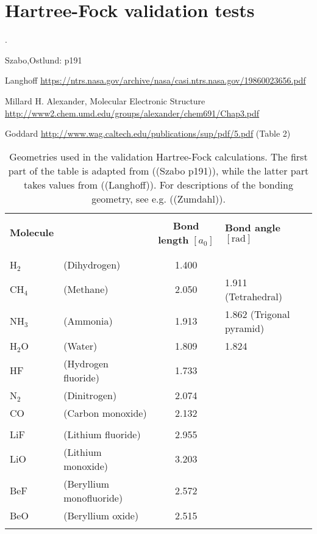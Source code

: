 \documentclass[a4paper]{article}
\title{}
\date{}
\author{}
\newcommand{\R}{\mathbb{R}}
\begin{document}
\renewcommand{\R}{{\bf R}}
\renewcommand{\r}{{\bf r}}
\newcommand{\p}{{\bf p}}
\newcommand{\q}{{\bf q}}
\renewcommand{\H}{\mathcal{H}}
\newcommand{\psit}{\left|\psi(t)\right\rangle}


\section{Hartree-Fock validation tests}
.

Szabo,Ostlund: p191

Langhoff \url{https://ntrs.nasa.gov/archive/nasa/casi.ntrs.nasa.gov/19860023656.pdf}

Millard H. Alexander, Molecular Electronic Structure \url{http://www2.chem.umd.edu/groups/alexander/chem691/Chap3.pdf}

Goddard \url{http://www.wag.caltech.edu/publications/sup/pdf/5.pdf} (Table 2)

\begin{table}
\setlength\extrarowheight{2pt}
\begin{tabularx}{\textwidth}{l X c l}
\hline
\hline
\\[-0.9em]
\textbf{Molecule} & & \textbf{Bond length} $[a_0]$ & \textbf{Bond angle} $[\text{rad}]$ \\
\\[-0.9em]
\hline
\\[-0.9em]
H${}_2$ & (Dihydrogen)   & 1.400 & \\
CH${}_4$ &(Methane)      & 2.050 & 1.911 (Tetrahedral)       \\
NH${}_3$ &(Ammonia)      & 1.913 & 1.862 (Trigonal pyramid)  \\
H${}_2$O &(Water)        & 1.809 & 1.824                     \\
HF &(Hydrogen fluoride)  & 1.733 & \\
N${}_2$ &(Dinitrogen)    & 2.074 & \\
CO &(Carbon monoxide)    & 2.132 & \\
\\[-0.0em]
LiF & (Lithium fluoride) & 2.955 & \\ %
LiO & (Lithium monoxide) & 3.203 & \\ %
BeF & (Beryllium monofluoride) & 2.572 & \\ %
BeO & (Beryllium oxide) & 2.515 & \\ %
\\[-0.9em]
\hline
\end{tabularx}
\caption{Geometries used in the validation Hartree-Fock calculations. The first part of the table is adapted from ((Szabo p191)), while the latter part takes values from ((Langhoff)). For descriptions of the bonding geometry, see e.g. ((Zumdahl)). \label{tab:hfv1}}
\end{table}
\end{document}
